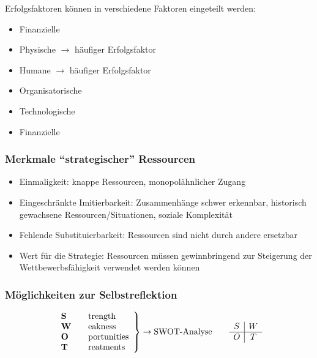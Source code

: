 \documentclass[a4paper,11pt, twoside]{article}
\newcommand\mpar[1]{\marginpar {\flushleft\small #1}}
\begin{document}
Erfolgsfaktoren können in verschiedene Faktoren eingeteilt werden:
\begin{itemize}
	\item Finanzielle
	\item Physische $\rightarrow$ häufiger Erfolgsfaktor
	\item Humane $\rightarrow$ häufiger Erfolgsfaktor
	\mpar{\textcolor{red}{Monopolstellung bei vorhanden Ressourcen ist immer wertvoll!}}
	\item Organisatorische
	\item Technologische
	\item Finanzielle
\end{itemize}
\mpar{\textcolor{red}{Ressourcen die jeder hat, sind nicht wertvoll!}}

\subsubsection*{Merkmale "`strategischer"' Ressourcen}
\begin{itemize}
	\item Einmaligkeit: knappe Ressourcen, monopolähnlicher Zugang  
	\item Eingeschränkte Imitierbarkeit: Zusammenhänge schwer erkennbar, historisch gewachsene Ressourcen/Situationen, soziale Komplexität	
	\item Fehlende Substituierbarkeit: Ressourcen sind nicht durch andere ersetzbar
	\item Wert für die Strategie: Ressourcen müssen gewinnbringend zur Steigerung der Wettbewerbsfähigkeit verwendet werden können
\end{itemize}

\subsubsection*{Möglichkeiten zur Selbstreflektion}
\mpar{\textcolor{red}{Erhebungen durch Kundenbefragung ODER Vergleich mit Konkurrenz}}
\[ \left.
\begin{array}{l l}
\text{\textbf{S}} & \quad \text{trength}\\
\text{\textbf{W}} & \quad \text{eakness}\\
\text{\textbf{O}} & \quad \text{portunities}\\
\text{\textbf{T}} & \quad \text{reatments}
\end{array} 
\right\} \to \text{SWOT-Analyse} \quad \quad	\begin{array}{c|c}
					  	 S & W \\
					  	 \hline
					  	 O & T
						\end{array} \]
\end{document}
